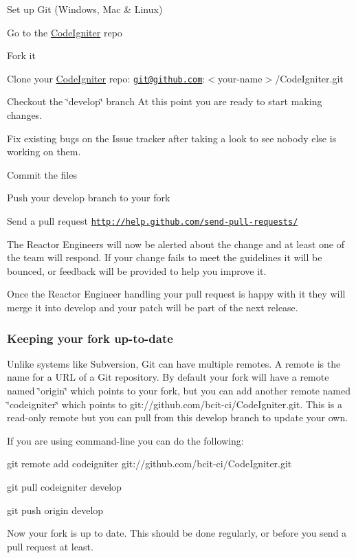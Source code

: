 \begin{DoxyEnumerate}
\item Set up Git (Windows, Mac \& Linux)
\item Go to the \hyperlink{namespace_code_igniter}{Code\+Igniter} repo
\item Fork it
\item Clone your \hyperlink{namespace_code_igniter}{Code\+Igniter} repo\+: \href{mailto:git@github.com}{\tt git@github.\+com}\+:$<$your-\/name$>$/\+Code\+Igniter.git
\item Checkout the \char`\"{}develop\char`\"{} branch At this point you are ready to start making changes.
\item Fix existing bugs on the Issue tracker after taking a look to see nobody else is working on them.
\item Commit the files
\item Push your develop branch to your fork
\item Send a pull request \href{http://help.github.com/send-pull-requests/}{\tt http\+://help.\+github.\+com/send-\/pull-\/requests/}
\end{DoxyEnumerate}

The Reactor Engineers will now be alerted about the change and at least one of the team will respond. If your change fails to meet the guidelines it will be bounced, or feedback will be provided to help you improve it.

Once the Reactor Engineer handling your pull request is happy with it they will merge it into develop and your patch will be part of the next release.

\subsubsection*{Keeping your fork up-\/to-\/date}

Unlike systems like Subversion, Git can have multiple remotes. A remote is the name for a U\+R\+L of a Git repository. By default your fork will have a remote named \char`\"{}origin\char`\"{} which points to your fork, but you can add another remote named \char`\"{}codeigniter\char`\"{} which points to {\ttfamily git\+://github.com/bcit-\/ci/\+Code\+Igniter.\+git}. This is a read-\/only remote but you can pull from this develop branch to update your own.

If you are using command-\/line you can do the following\+:


\begin{DoxyEnumerate}
\item {\ttfamily git remote add codeigniter git\+://github.com/bcit-\/ci/\+Code\+Igniter.\+git}
\item {\ttfamily git pull codeigniter develop}
\item {\ttfamily git push origin develop}
\end{DoxyEnumerate}

Now your fork is up to date. This should be done regularly, or before you send a pull request at least. 